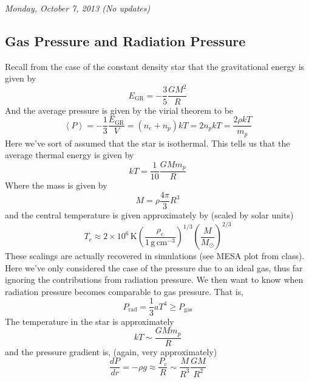 \documentclass[10pt]{article}
\numberwithin{equation}{section}
\newcommand{\n}{\noindent}
\newcommand{\avg}[1]{\left\langle#1\right\rangle}
\begin{document}
\n\textit{Monday, October 7, 2013 (No updates)}
	\subsection{Gas Pressure and Radiation Pressure}
		Recall from the case of the constant density star that the 
gravitational energy is given by
		\begin{equation}
			\label{GPRP.1} E_{\mathrm{GR}}=-\frac{3}{5}\frac{GM^2}{R}
		\end{equation}
		And the average pressure is given by the virial theorem to be
		\begin{equation}
			\label{GPRP.2} \avg{P}=-\frac{1}{3}\frac{E_{\mathrm{GR}}}{V}=
(n_e+n_p)kT=2n_pkT=\frac{2\rho kT}{m_p}
		\end{equation}
		Here we've sort of assumed that the star is
                isothermal. This tells us that the average thermal
                energy is given by
		\begin{equation}
			\label{GPRP.3} kT=\frac{1}{10}\frac{GMm_p}{R}
		\end{equation}
		Where the mass is given by
		\begin{equation}
			\label{GPRP.4} M=\rho\frac{4\pi}{3}R^3
		\end{equation}
		and the central temperature is given approximately by (scaled by 
solar units)
		\begin{equation}
			\label{GPRP.5} T_c\approx2\times 10^6\,\mathrm{K}\left(\frac
{\rho_c}{1\,\mathrm{g\,cm^{-3}}}\right)^{1/3}\left(\frac{M}{M_\odot}\right)
^{2/3}
		\end{equation}
		These scalings are actually recovered in simulations
                (see MESA plot from class). Here we've only considered
                the case of the pressure due to an ideal gas, thus far
                ignoring the contributions from radiation pressure. We
                then want to know when radiation pressure becomes
                comparable to gas pressure. That is,
		\begin{equation}
			\label{GPRP.6} P_{\mathrm{rad}}=\frac{1}{3} aT^4\geq P_{\mathrm
{gas}}
		\end{equation}
		The temperature in the star is approximately
		\begin{equation}
			\label{GPRP.7} kT\sim\frac{GMm_p}{R}
		\end{equation}
		and the pressure gradient is, (again, very approximately)
		\begin{equation}
			\label{GPRP.8} \frac{dP}{dr}=-\rho g\approx \frac{P_c}{R}\sim
\frac{M}{R^3}\frac{GM}{R^2}
		\end{equation}
\end{document}
